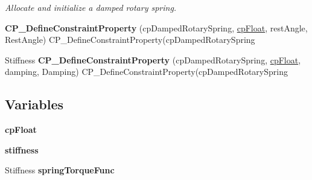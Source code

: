 \begin{DoxyCompactItemize}
\begin{DoxyCompactList}\small\item\em Allocate and initialize a damped rotary spring. \end{DoxyCompactList}\item 
\hypertarget{group__cp_damped_rotary_spring_gace54fed7d15dfdf8de8d2d66a91ee498}{{\bfseries C\-P\-\_\-\-Define\-Constraint\-Property} (cp\-Damped\-Rotary\-Spring, \hyperlink{group__basic_types_gac1ed65573e035bf892505768c852d8d3}{cp\-Float}, rest\-Angle, Rest\-Angle) C\-P\-\_\-\-Define\-Constraint\-Property(cp\-Damped\-Rotary\-Spring}\label{group__cp_damped_rotary_spring_gace54fed7d15dfdf8de8d2d66a91ee498}

\item 
\hypertarget{group__cp_damped_rotary_spring_ga8655569cb5c8b9098ccc72a743103454}{Stiffness {\bfseries C\-P\-\_\-\-Define\-Constraint\-Property} (cp\-Damped\-Rotary\-Spring, \hyperlink{group__basic_types_gac1ed65573e035bf892505768c852d8d3}{cp\-Float}, damping, Damping) C\-P\-\_\-\-Define\-Constraint\-Property(cp\-Damped\-Rotary\-Spring}\label{group__cp_damped_rotary_spring_ga8655569cb5c8b9098ccc72a743103454}

\end{DoxyCompactItemize}
\subsection*{Variables}
\begin{DoxyCompactItemize}
\item 
\hypertarget{group__cp_damped_rotary_spring_ga771844b3ae466da0613e76d364d00bd3}{{\bfseries cp\-Float}}\label{group__cp_damped_rotary_spring_ga771844b3ae466da0613e76d364d00bd3}

\item 
\hypertarget{group__cp_damped_rotary_spring_gaad12ff4daf071cba3f2d738845587022}{{\bfseries stiffness}}\label{group__cp_damped_rotary_spring_gaad12ff4daf071cba3f2d738845587022}

\item 
\hypertarget{group__cp_damped_rotary_spring_ga3622ef16f45fca82cd19c56b09c07037}{Stiffness {\bfseries spring\-Torque\-Func}}\label{group__cp_damped_rotary_spring_ga3622ef16f45fca82cd19c56b09c07037}

\end{DoxyCompactItemize}
